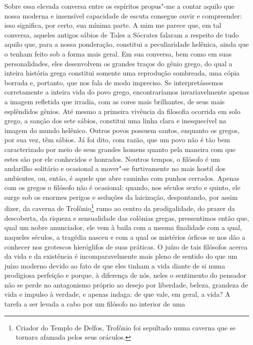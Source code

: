 Sobre essa elevada conversa entre os espíritos propus"-me a contar aquilo
que nossa moderna e insensível capacidade de escuta consegue ouvir e
compreender: isso significa, por certo, sua mínima parte. A mim me
parece que, em tal conversa, aqueles antigos sábios de Tales a Sócrates
falaram a respeito de tudo aquilo que, para a nossa ponderação,
constitui a peculiaridade helênica, ainda que o tenham feito sob a
forma mais geral. Em sua conversa, bem como em suas personalidades,
eles desenvolvem os grandes traços do gênio grego, do qual a inteira
história grega constitui somente uma reprodução sombreada, uma cópia
borrada e, portanto, que nos fala de modo impreciso. Se
interpretássemos corretamente a inteira vida do povo grego,
encontraríamos invariavelmente apenas a imagem refletida que irradia,
com as cores mais brilhantes, de seus mais esplêndidos gênios. Até
mesmo a primeira vivência da filosofia ocorrida em solo grego, a
sanção dos sete sábios, constitui uma linha clara e inesquecível na
imagem do mundo helênico. Outros povos possuem santos, enquanto os \label{santos}
gregos, por sua vez, têm sábios. Já foi dito, com razão, que um povo
não é tão bem caracterizado por meio de seus grandes homens quanto pela
maneira com que estes são por ele conhecidos e honrados. Noutros
tempos, o filósofo é um andarilho solitário e ocasional a mover"-se
furtivamente no mais hostil dos ambientes, ou, então, é aquele que abre
caminho com punhos cerrados. Apenas com os gregos o filósofo não é
ocasional: quando, nos séculos sexto e quinto, ele surge sob os enormes
perigos e seduções da laicização, despontando, por assim dizer, da
caverna de Trofônio\footnote{ Criador do Templo de Delfos, Trofônio foi
sepultado numa caverna que se tornara afamada pelos seus oráculos.} 
rumo ao centro da prodigalidade, do prazer da descoberta, da
riqueza e sensualidade das colônias gregas, pressentimos então que,
qual um nobre anunciador, ele vem à baila com a mesma finalidade com a
qual, naqueles séculos, a tragédia nasceu e com a qual os mistérios
órficos se nos dão a conhecer nos grotescos hieróglifos de suas
práticas. O juízo de tais filósofos acerca da vida e da existência é
incomparavelmente mais pleno de sentido do que um juízo moderno devido
ao fato de que eles tinham a vida diante de si numa prodigiosa perfeição
e porque, à diferença de nós, neles o sentimento do pensador não se
perde no antagonismo próprio ao desejo por liberdade, beleza, grandeza
de vida e impulso à verdade, e apenas indaga: de que vale, em geral, a
vida? A tarefa a ser levada a cabo por um filósofo no interior de uma \label{tarefaaserlevada}
